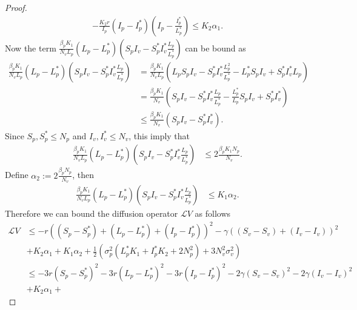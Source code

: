 \begin{proof}
\begin{align*}
		-\frac{K_2r}{I_p}
		(I_p - I_p ^*)
		\left(
			I_p - \frac{I_p ^*}{L_p ^*}
		\right)\leq K_2\alpha_1.
	\end{align*}
%
	Now the term 
	$
	\frac{\beta_p K_1}{N_vL_p}
	(L_p - L_p^*)
	\left(
		S_p I_v - S_p ^* I_v ^*
		\frac{L_p}{L_p^*}
	\right)
	$ can be bound as
	\begin{align*}
		\frac{\beta_p K_1}{N_vL_p}
		(L_p - L_p^*)
		\left(
			S_pI_v - S_p ^* I_v ^* 
			\frac{L_p}{L_p^*}
		\right)
			&=
				\frac{\beta_p K_1}{N_v L_p}
					\left(
						L_p S_p I_v - S_p ^* I_v ^* 
						\frac{L_p ^2 }{L_p ^* } - L_p ^*S_pI_v + 
						S_p ^* I_v ^* L_p
					\right)
				\\
			&=		
				\frac{\beta_p K_1}{N_v}
				\left(S_p I_v - S_p ^* I_v ^* 
					\frac{L_p}{L_p ^* } - 
					\frac{L_p ^* }{L_p} S_pI_v + S_p^*I_v^*
				\right)
				\\
			&\leq
				\frac{\beta_p K_1}{N_v}
				\left(
					S_p I_v - S_p ^* I_v ^* 
				\right).	
	\end{align*}
%
	Since 
	$ 
		S_p,
		S_p ^* 
		\leq N_p
	$ 
	and 
	$ 
		I_v, I_v ^* \leq N_v
	$, this imply that
	\begin{align*}
		\frac{\beta_p K_1}{N_vL_p}
		(L_p - L_p ^* )
		\left(
			S_pI_v - S_p ^* I_v ^* 
			\frac{L_p}{L_p ^* }
		\right)
			&\leq
				2\frac{\beta_p K_1 N_p}{N_v}.
	\end{align*}
	Define $\alpha_2:=2\frac{\beta_p N_p}{N_v}$, then
	\begin{align*}
		\frac{\beta_p K_1}{N_vL_p}(L_p - L_p^*)
		\left(
			S_p I_v - S_p ^* I_v ^*
			\frac{L_p}{L_p^*}
		\right)
			&\leq
				K_1\alpha_2.
	\end{align*}
	Therefore we can bound the diffusion operator $\mathcal{L} V$ as follows
	\begin{align*}
		\mathcal{L}V 
			&\leq 
				-r 
				\left(
					(S_p - S_p ^*) + 
					(L_p - L_p ^*) +
					(I_p - I_p ^*)
				\right)^2 - 
				\gamma 
				\left(
					(S_v - S_v) + 
					(I_v - I_v)
				\right) ^ 2
				\\
			&+
				K_2 \alpha_1 + 
				K_1 \alpha_2 + 
				\frac{1}{2}
				\left(
					\sigma_p ^2 
					(
						L_p ^* K_1 + 
						I_p ^* K_2 + 
						2 N_p ^ 2
					) + 3 N_v ^ 2 
					\sigma_v ^ 2
				\right)
				\\
			&\leq 
				-3r 
				(S_p - S_p ^*) ^ 2 - 
				3r 
				(L_p - L_p ^*) ^2 - 
				3r
				(I_p - I_p ^*) ^ 2 - 
				2 \gamma 
				(S_v - S_v) ^ 2 - 
				2 \gamma 
				(I_v - I_v) ^ 2 
				\\
			&+
				K_2 \alpha_1 + 

\end{align*}
\end{proof}
